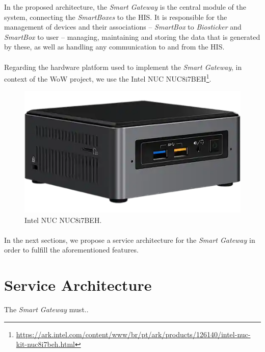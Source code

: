 

In the proposed architecture, the \textit{Smart Gateway} is the central module of the system, connecting the \textit{SmartBoxes} to the \acs{HIS}. It is responsible for the management of devices and their associations -- \textit{SmartBox} to \textit{Biosticker} and \textit{SmartBox} to user -- managing, maintaining and storing the data that is generated by these, as well as handling any communication to and from the \acs{HIS}. 


\paragraph{} Regarding the hardware platform used to implement the \textit{Smart Gateway}, in context of the \acs{WoW} project, we use the Intel NUC NUC8i7BEH\footnote{\url{https://ark.intel.com/content/www/br/pt/ark/products/126140/intel-nuc-kit-nuc8i7beh.html}}.

\begin{figure}[H]
    \centering
    \includegraphics[width=0.5\linewidth]{images/gateway-image.png}
    \caption[Intel NUC NUC8i7BEH.]{Intel NUC NUC8i7BEH.}
    \label{fig:gateway_image}
\end{figure}


\paragraph{} In the next sections, we propose a service architecture for the \textit{Smart Gateway} in order to fulfill the aforementioned features.



\section{Service Architecture}

The \textit{Smart Gateway} must..

